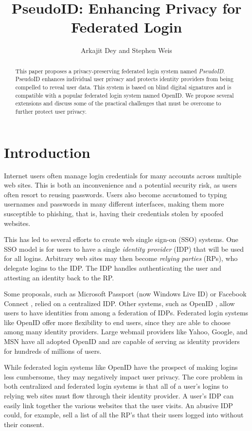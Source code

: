 \documentclass{llncs}
\title{PseudoID: Enhancing Privacy for Federated Login}
\author{Arkajit Dey\inst{1} and Stephen Weis\inst{2}}
\institute{Massachusetts Institute of Technology, Cambridge, MA, USA 02139
\and
Google Inc., Mountain View, CA, USA 94043}
\begin{document}
\maketitle

\begin{abstract}
This paper proposes a privacy-preserving federated login system named
\emph{PseudoID}. PseudoID enhances individual user privacy and
protects identity providers from being compelled to reveal user
data. This system is based on blind digital signatures and is
compatible with a popular federated login system named OpenID. We
propose several extensions and discuss some of the practical
challenges that must be overcome to further protect user privacy.
\end{abstract}

\section{Introduction}
\label{sec:intro}

Internet users often manage login credentials for many accounts across
multiple web sites. This is both an inconvenience and a potential
security risk, as users often resort to reusing passwords. Users also
become accustomed to typing usernames and passwords in many different
interfaces, making them more susceptible to phishing, that is, having
their credentials stolen by spoofed websites.

This has led to several efforts to create web single sign-on (SSO)
systems. One SSO model is for users to have a single \emph{identity
  provider} (IDP) that will be used for all logins. Arbitrary web
sites may then become \emph{relying parties} (RPs), who delegate
logins to the IDP. The IDP handles authenticating the user and
attesting an identity back to the RP.

Some proposals, such as Microsoft Passport (now Windows Live ID)
\cite{MSPass} or Facebook Connect \cite{FBConnect}, relied on a
centralized IDP. Other systems, such as OpenID \cite{OID}, allow users
to have identities from among a federation of IDPs. Federated login
systems like OpenID offer more flexibility to end users, since they
are able to choose among many identity providers. Large webmail
providers like Yahoo, Google, and MSN have all adopted OpenID
\cite{YOP,Sac08,WLOP08} and are capable of serving as identity
providers for hundreds of millions of users.

While federated login systems like OpenID have the prospect of making
logins less cumbersome, they may negatively impact user privacy. The
core problem in both centralized and federated login systems is that
all of a user's logins to relying web sites must flow through their
identity provider. A user's IDP can easily link together the various
websites that the user visits. An abusive IDP could, for example, sell
a list of all the RP's that their users logged into without their
consent.
\end{document}
